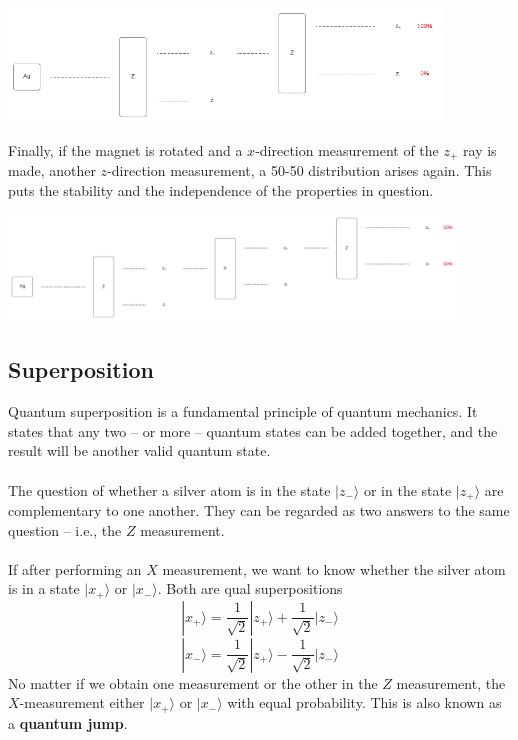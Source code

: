 \documentclass{article}
\begin{document}
\begin{center}
	\includegraphics[width=11.5cm]{assets/two_z_measurements.pdf}
\end{center}
Finally, if the magnet is rotated and a $x$-direction measurement of the $z_+$ ray is made, another $z$-direction measurement, a 50-50 distribution arises again. This puts the stability and the independence of the properties in question.

\begin{center}
	\includegraphics[width=12cm]{assets/z_x_z_measurements.pdf}
\end{center}

\subsection{Superposition}
Quantum superposition is a fundamental principle of quantum mechanics. It states that any two -- or more -- quantum states can be added together, and the result will be another valid quantum state. \\ \\
The question of whether a silver atom is in the state $| z_- \rangle$ or in the state $| z_+ \rangle$ are complementary to one another. They can be regarded as two answers to the same question -- i.e., the $Z$ measurement. \\ \\
If after performing an $X$ measurement, we want to know whether the silver atom is in a state $| x_+ \rangle$ or $| x_- \rangle$. Both are qual superpositions
\[ |x_+\rangle = \frac{1}{\sqrt{2}}|z_+\rangle + \frac{1}{\sqrt{2}}|z_-\rangle \]
\[ |x_-\rangle = \frac{1}{\sqrt{2}}|z_+\rangle - \frac{1}{\sqrt{2}}|z_-\rangle \]
No matter if we obtain one measurement or the other in the $Z$ measurement, the $X$-measurement either $| x_+ \rangle$ or $| x_- \rangle$ with equal probability. This is also known as a \textbf{quantum jump}.
\end{document}
